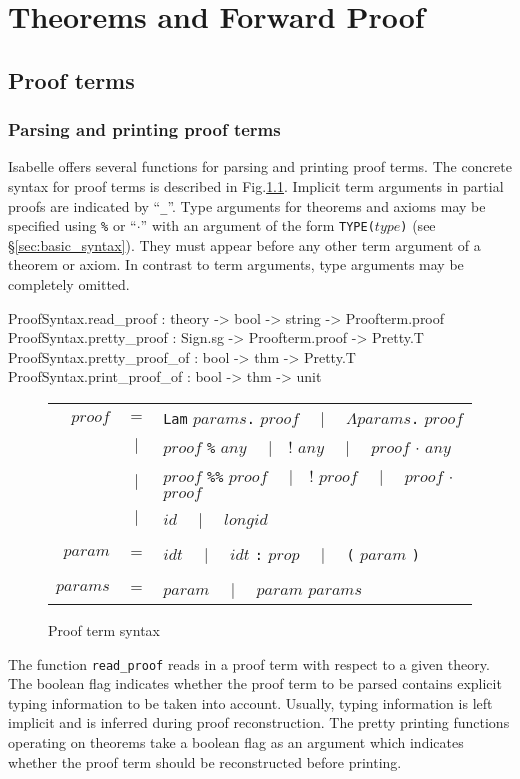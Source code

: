 
\chapter{Theorems and Forward Proof}

\section{Proof terms}\label{sec:proofObjects}


\subsection{Parsing and printing proof terms}

Isabelle offers several functions for parsing and printing
proof terms. The concrete syntax for proof terms is described
in Fig.\ts\ref{fig:proof_gram}.
Implicit term arguments in partial proofs are indicated
by ``{\tt _}''.
Type arguments for theorems and axioms may be specified using
\verb!%! or ``$\cdot$'' with an argument of the form {\tt TYPE($type$)}
(see \S\ref{sec:basic_syntax}).
They must appear before any other term argument of a theorem
or axiom. In contrast to term arguments, type arguments may
be completely omitted.
\begin{ttbox}
ProofSyntax.read_proof : theory -> bool -> string -> Proofterm.proof
ProofSyntax.pretty_proof : Sign.sg -> Proofterm.proof -> Pretty.T
ProofSyntax.pretty_proof_of : bool -> thm -> Pretty.T
ProofSyntax.print_proof_of : bool -> thm -> unit
\end{ttbox}
\begin{figure}
\begin{center}
\begin{tabular}{rcl}
$proof$  & $=$ & {\tt Lam} $params${\tt .} $proof$ ~~$|$~~
                 $\Lambda params${\tt .} $proof$ \\
         & $|$ & $proof$ \verb!%! $any$ ~~$|$~~
                 $proof$ $\cdot$ $any$ \\
         & $|$ & $proof$ \verb!%%! $proof$ ~~$|$~~
                 $proof$ {\boldmath$\cdot$} $proof$ \\
         & $|$ & $id$ ~~$|$~~ $longid$ \\\\
$param$  & $=$ & $idt$ ~~$|$~~ $idt$ {\tt :} $prop$ ~~$|$~~
                 {\tt (} $param$ {\tt )} \\\\
$params$ & $=$ & $param$ ~~$|$~~ $param$ $params$
\end{tabular}
\end{center}
\caption{Proof term syntax}\label{fig:proof_gram}
\end{figure}
The function {\tt read_proof} reads in a proof term with
respect to a given theory. The boolean flag indicates whether
the proof term to be parsed contains explicit typing information
to be taken into account.
Usually, typing information is left implicit and
is inferred during proof reconstruction. The pretty printing
functions operating on theorems take a boolean flag as an
argument which indicates whether the proof term should
be reconstructed before printing.

